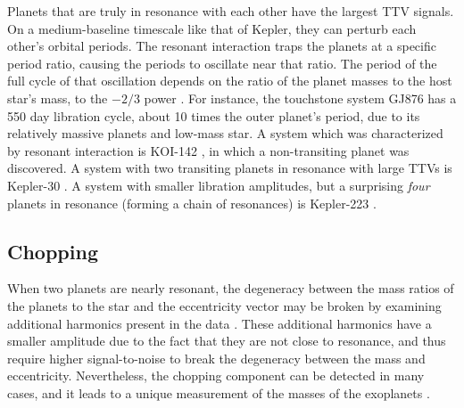 \documentclass[graybox,natbib,nosecnum]{svmult}
\begin{document}
Planets that are truly in resonance with each other have the largest TTV signals.  On a medium-baseline timescale like that of Kepler, they can perturb each other's orbital periods.  The resonant interaction traps the planets at a specific period ratio, causing the periods to oscillate near that ratio.  The period of the full cycle of that oscillation depends on the ratio of the planet masses to the host star's mass, to the $-2/3$ power \citep{2005MNRAS.359..567A,2016ApJ...823...72N}.  For instance, the touchstone system GJ876 has a 550 day libration cycle, about 10 times the outer planet's period, due to its relatively massive planets and low-mass star.  A system which was characterized by resonant interaction is KOI-142 \citep{2013ApJ...777....3N}, in which a non-transiting planet was discovered.   A system with two transiting planets in resonance with large TTVs is Kepler-30 \citep{2012ApJ...750..114F}.  A system with smaller libration amplitudes, but a surprising \emph{four} planets in resonance (forming a chain of resonances) is Kepler-223 \citep{2016Natur.533..509M}.


\subsection{Chopping}

When two planets are nearly resonant, the degeneracy between the mass ratios of the planets to the star
and the eccentricity vector may be broken by examining additional harmonics present in the data \citep{2015ApJ...802..116D}.
These additional harmonics have a smaller amplitude due to the fact that they are not close to resonance,
and thus require higher signal-to-noise to break the degeneracy between the mass and eccentricity.
Nevertheless, the chopping component can be detected in many cases, and it leads to a unique measurement
of the masses of the exoplanets \citep{2014ApJ...790...58N,2014ApJ...795..167S,2015ApJ...802..116D}.
\end{document}
